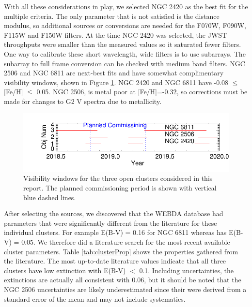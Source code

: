 \documentclass{aastex6}
\begin{document}
With all these considerations in play, we selected NGC 2420 as the best fit for the multiple criteria.
The only parameter that is not satisfied is the distance modulus, so additional sources or conversions are needed for the F070W, F090W, F115W and F150W filters.
At the time NGC 2420 was selected, the JWST throughputs were smaller than the measured values so it saturated fewer filters.
One way to calibrate these short wavelength, wide filters is to use subarrays.
The subarray to full frame conversion can be checked with medium band filters.
NGC 2506 and NGC 6811 are next-best fits and have somewhat complimentary visibility windows, shown in Figure \ref{fig:clusterVis}. NGC 2420 and NGC 6811 have -0.08 $\le$ [Fe/H] $\le$ 0.05.
NGC 2506, is metal poor at [Fe/H]=-0.32, so corrections must be made for changes to G2 V spectra due to metallicity.

\begin{figure}
\centering
\includegraphics[width=.4\columnwidth]{cluster_visibilty.pdf}
\caption{Visibility windows for the three open clusters considered in this report.
The planned commissioning period is shown with vertical blue dashed lines.}\label{fig:clusterVis}
\end{figure}

After selecting the sources, we discovered that the WEBDA database had parameters that were significantly different from the literature for these individual clusters.
For example E(B-V) = 0.16 for NGC 6811 whereas \citet{molendaz2016spec6811} has E(B-V) = 0.05.
We therefore did a literature search for the most recent available cluster parameters.
Table \ref{tab:clusterProp} shows the properties gathered from the literature.
The most up-to-date literature values indicate that all three clusters have low extinction with E(B-V) $<$ 0.1.
Including uncertainties, the extinctions are actually all consistent with 0.06, but it should be noted that the NGC 2506 uncertainties are likely underestimated since their were derived from a standard error of the mean and may not include systematics.
\end{document}
